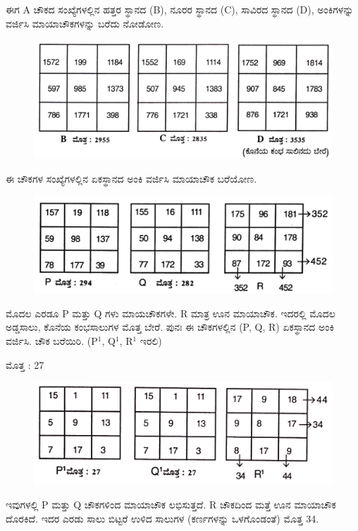 ಈಗ A ಚೌಕದ ಸಂಖ್ಯೆಗಳಲ್ಲಿನ ಹತ್ತರ ಸ್ಥಾನದ (B), ನೂರರ ಸ್ಥಾನದ (C), ಸಾವಿರದ ಸ್ಥಾನದ (D), ಅಂಕಿಗಳನ್ನು ವರ್ಜಿಸಿ ಮಾಯಾಚೌಕಗಳನ್ನು ಬರೆದು ನೋಡೋಣ.
\begin{figure}[H]
\includegraphics{src/figures/chap7/fig7.10.jpg}
\end{figure}

ಈ ಚೌಕಗಳ ಸಂಖ್ಯೆಗಳಲ್ಲಿನ ಏಕಸ್ಥಾನದ ಅಂಕಿ ವರ್ಜಿಸಿ ಮಾಯಾಚೌಕ ಬರೆಯೋಣ.
\begin{figure}[H]
\includegraphics{src/figures/chap7/fig7.11.jpg}
\end{figure}

ಮೊದಲ ಎರಡೂ P ಮತ್ತು Q ಗಳು ಮಾಯಚೌಕಗಳೇ. R ಮಾತ್ರ ಊನ ಮಾಯಾಚೌಕ. ಇದರಲ್ಲಿ ಮೊದಲ ಅಡ್ಡಸಾಲು, ಕೊನೆಯ ಕಂಭಸಾಲುಗಳ ಮೊತ್ತ ಬೇರೆ. ಪುನಃ ಈ ಚೌಕಗಳಲ್ಲಿನ (P, Q, R) ಏಕಸ್ಥಾನದ ಅಂಕಿ ವರ್ಜಿಸಿ. ಚೌಕ ಬರೆಯಿರಿ. (P$^1$, Q$^1$, R$^1$ ಇರಲಿ)

ಮೊತ್ತ : 27
\begin{figure}[H]
\includegraphics{src/figures/chap7/fig7.12.jpg}
\end{figure}

ಇವುಗಳಲ್ಲಿ P ಮತ್ತು Q ಚೌಕಗಳಿಂದ ಮಾಯಾಚೌಕ ಲಭಿಸುತ್ತದೆ. R ಚೌಕದಿಂದ ಮತ್ತೆ ಊನ ಮಾಯಾಚೌಕ ದೊರಕಿದೆ. ಇದರ ಎರಡು ಸಾಲು ಬಿಟ್ಟರೆ ಉಳಿದ ಸಾಲುಗಳ (ಕರ್ಣಗಳನ್ನು ಒಳಗೊಂಡಂತೆ) ಮೊತ್ತ 34.

